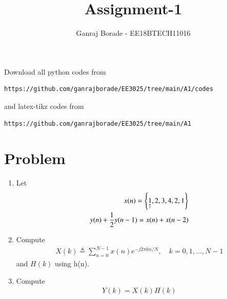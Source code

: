 \documentclass[journal,12pt,twocolumn]{IEEEtran}
\renewcommand\thesection{\arabic{section}}
\begin{document}
     \def\rightbox#1{\makebox[0in][r]{#1}}
     \def\centbox#1{\makebox[0in]{#1}}
     \def\topbox#1{\raisebox{-\baselineskip}[0in][0in]{#1}}
     \def\midbox#1{\raisebox{-0.5\baselineskip}[0in][0in]{#1}}
\vspace{3cm}
\title{Assignment-1}
\author{Ganraj Borade - EE18BTECH11016}
\maketitle
\newpage
\bigskip
\renewcommand{\thefigure}{\theenumi}
\renewcommand{\thetable}{\theenumi}
Download all python codes from 
\begin{lstlisting}
https://github.com/ganrajborade/EE3025/tree/main/A1/codes
\end{lstlisting}
%
and latex-tikz codes from 
%
\begin{lstlisting}
https://github.com/ganrajborade/EE3025/tree/main/A1
\end{lstlisting}

\section{Problem}
\begin{enumerate}[label=\thesection.\arabic*.,ref=\thesection.\theenumi]
    
    \item Let
    \begin{align}
        x(n) = \cbrak{\underset{\uparrow}{1},2,3,4,2,1}
         \label{eq:equation0}\\
        y(n) + \frac{1}{2}y(n-1) = x(n) + x(n-2)	
        \label{eq:equation1}
    \end{align}
    
    \item Compute 
    \begin{align}
        X(k) \triangleq \sum_{n=0}^{N-1} x(n) e^{-j 2 \pi k n / N}, \quad k=0,1, \ldots, N-1
    \end{align}
    and $H(k)$ using h(n).
    
    \item Compute 
    \begin{align}
    Y(k) = X(k)H(k)
    \end{align}
\end{enumerate}
\end{document}
